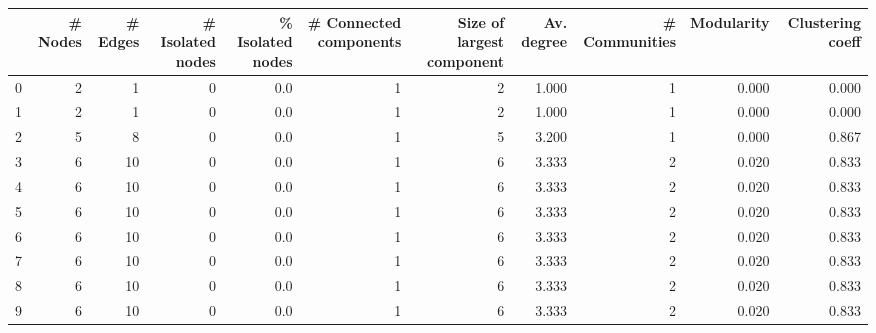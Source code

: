 \begin{tabular}{lrrrrrrrrrr}
\toprule
{} &  \# Nodes &  \# Edges &  \# Isolated nodes &  \% Isolated nodes &  \# Connected components &  Size of largest component &  Av. degree &  \# Communities &  Modularity &  Clustering coeff \\
\midrule
0  &        2 &        1 &                 0 &               0.0 &                       1 &                          2 &       1.000 &              1 &       0.000 &             0.000 \\
1  &        2 &        1 &                 0 &               0.0 &                       1 &                          2 &       1.000 &              1 &       0.000 &             0.000 \\
2  &        5 &        8 &                 0 &               0.0 &                       1 &                          5 &       3.200 &              1 &       0.000 &             0.867 \\
3  &        6 &       10 &                 0 &               0.0 &                       1 &                          6 &       3.333 &              2 &       0.020 &             0.833 \\
4  &        6 &       10 &                 0 &               0.0 &                       1 &                          6 &       3.333 &              2 &       0.020 &             0.833 \\
5  &        6 &       10 &                 0 &               0.0 &                       1 &                          6 &       3.333 &              2 &       0.020 &             0.833 \\
6  &        6 &       10 &                 0 &               0.0 &                       1 &                          6 &       3.333 &              2 &       0.020 &             0.833 \\
7  &        6 &       10 &                 0 &               0.0 &                       1 &                          6 &       3.333 &              2 &       0.020 &             0.833 \\
8  &        6 &       10 &                 0 &               0.0 &                       1 &                          6 &       3.333 &              2 &       0.020 &             0.833 \\
9  &        6 &       10 &                 0 &               0.0 &                       1 &                          6 &       3.333 &              2 &       0.020 &             0.833 \\

\end{tabular}

